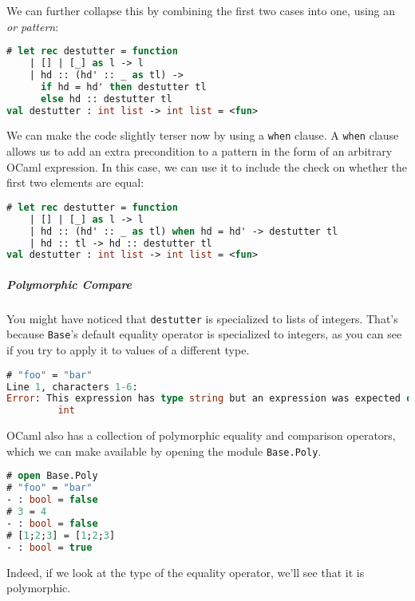 We can further collapse this by combining the first two cases into one,
using an \emph{or pattern}:

\begin{lstlisting}[language=Caml]
# let rec destutter = function
    | [] | [_] as l -> l
    | hd :: (hd' :: _ as tl) ->
      if hd = hd' then destutter tl
      else hd :: destutter tl
val destutter : int list -> int list = <fun>
\end{lstlisting}

We can make the code slightly terser now by using a
\passthrough{\lstinline!when!} clause. A \passthrough{\lstinline!when!}
clause allows us to add an extra precondition to a pattern in the form
of an arbitrary OCaml expression. In this case, we can use it to include
the check on whether the first two elements are equal:

\begin{lstlisting}[language=Caml]
# let rec destutter = function
    | [] | [_] as l -> l
    | hd :: (hd' :: _ as tl) when hd = hd' -> destutter tl
    | hd :: tl -> hd :: destutter tl
val destutter : int list -> int list = <fun>
\end{lstlisting}

\hypertarget{polymorphic-compare}{%
\subparagraph{Polymorphic Compare}\label{polymorphic-compare}}

You might have noticed that \passthrough{\lstinline!destutter!} is
specialized to lists of integers. That's because
\passthrough{\lstinline!Base!}'s default equality operator is
specialized to integers, as you can see if you try to apply it to values
of a different type.

\begin{lstlisting}[language=Caml]
# "foo" = "bar"
Line 1, characters 1-6:
Error: This expression has type string but an expression was expected of type
         int
\end{lstlisting}

OCaml also has a collection of polymorphic equality and comparison
operators, which we can make available by opening the module
\passthrough{\lstinline!Base.Poly!}.

\begin{lstlisting}[language=Caml]
# open Base.Poly
# "foo" = "bar"
- : bool = false
# 3 = 4
- : bool = false
# [1;2;3] = [1;2;3]
- : bool = true
\end{lstlisting}

Indeed, if we look at the type of the equality operator, we'll see that
it is polymorphic.

